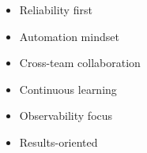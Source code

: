 %
%
%

\twocolumnsection
{
\begin{skills}
\end{skills}}
{
\vspace{1em}
\begin{itemize}
	\item Reliability first
	\item Automation mindset                 
    \item Cross-team collaboration
    \item Continuous learning
    \item Observability focus
    \item Results-oriented
\end{itemize}
}


